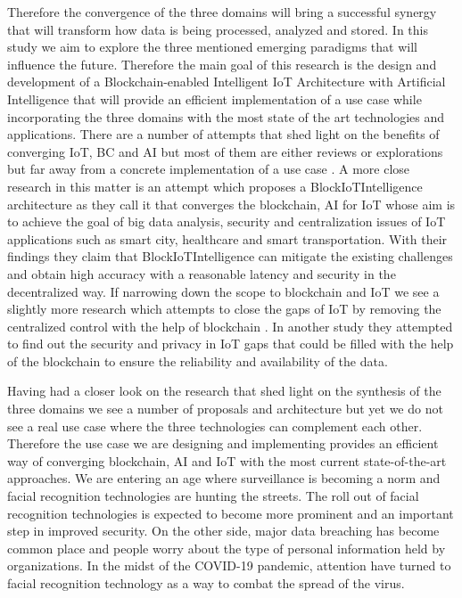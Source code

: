 Therefore the convergence of the three domains will bring a successful synergy that will transform how data is being processed, analyzed and stored. In this study we aim to explore the three mentioned emerging paradigms that will influence the future. Therefore the main goal of this research is the design and development of a Blockchain-enabled Intelligent IoT Architecture with Artificial Intelligence that will provide an efficient implementation of a use case while incorporating the three domains with the most state of the art technologies and applications. 
There are a number of attempts that shed light on the benefits of converging IoT, BC and AI \cite{bdcc4040028} but most of them are either reviews or explorations but far away from a concrete implementation of a use case \cite{Parker_Bach_2020}. A more close research in this matter is an attempt \cite{blockiotintelligent} which proposes a BlockIoTIntelligence architecture as they call it that converges the blockchain, AI for IoT whose aim is to achieve the goal of big data analysis, security and centralization issues of IoT applications such as smart city, healthcare and smart transportation. With their findings they claim that BlockIoTIntelligence can mitigate the existing challenges and obtain high accuracy with a reasonable latency and security in the decentralized way. 
If narrowing down the scope to blockchain and IoT we see a slightly more research which attempts to close the gaps of IoT by removing the centralized control with the help of blockchain \cite{9314805}.
In another study \cite{10.1145/3417987} they attempted to find out the security and privacy in IoT  gaps that could be filled with the help of the blockchain to ensure the reliability and availability of the data. 

Having had a closer look on the research that shed light on the synthesis of the three domains we see a number of proposals and architecture but yet we do not see a real use case where the three technologies can complement each other. Therefore the use case we are designing and implementing provides an efficient way of converging blockchain, AI and IoT with the most current state-of-the-art approaches. 
We are entering an age where surveillance is becoming a norm and facial recognition technologies are hunting the streets. The roll out of facial recognition technologies is expected to become more prominent and an important step in improved security. On the other side, major data breaching has become common place and people worry about the type of personal information held by organizations. In the midst of the COVID-19 pandemic, attention have turned to facial recognition technology as a way to combat the spread of the virus.

